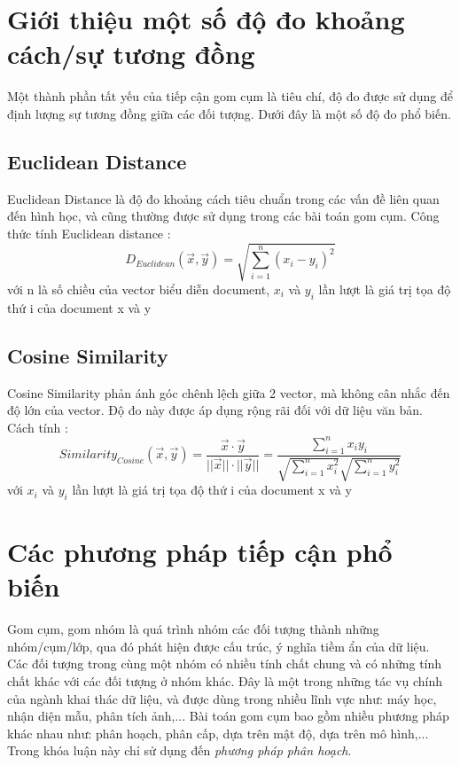 \section{Giới thiệu một số độ đo khoảng cách/sự tương đồng} \label{distances}
Một thành phần tất yếu của tiếp cận gom cụm là tiêu chí, độ đo được sử dụng để định lượng sự tương đồng giữa các đối tượng. Dưới đây là một số độ đo phổ biến.
	\subsection*{Euclidean Distance}
	Euclidean Distance là độ đo khoảng cách tiêu chuẩn trong các vấn đề liên quan đến hình học, và cũng thường được sử dụng trong các bài toán gom cụm. Công thức tính Euclidean distance \cite{IntroToIR}:
		\begin{equation}
		D_{Euclidean}(\vec{x}, \vec{y}) = \sqrt{\sum_{i=1}^n (x_i-y_i)^2}
		\end{equation}
	với n là số chiều của vector biểu diễn document, $x_i$ và $y_i$ lần lượt là giá trị tọa độ thứ i của document x và y\\	
	\subsection*{Cosine Similarity}
	Cosine Similarity phản ánh góc chênh lệch giữa 2 vector, mà không cân nhắc đến độ lớn của vector. Độ đo này được áp dụng rộng rãi đối với dữ liệu văn bản. Cách tính \cite{IntroToIR}: 
		\begin{equation}
		Similarity_{Cosine}(\vec{x}, \vec{y}) = \frac {\vec{x} \cdot \vec{y}}{||\vec{x}|| \cdot ||\vec{y}||} = \frac{\sum_{i=1}^{n}x_iy_i}{\sqrt{\sum_{i=1}^{n}x_i^2} \sqrt{\sum_{i=1}^{n}y_i^2}}	
		\end{equation}
	với  $x_i$ và $y_i$ lần lượt là giá trị tọa độ thứ i của document x và y
\section{Các phương pháp tiếp cận phổ biến}
Gom cụm, gom nhóm là quá trình nhóm các đối tượng thành những nhóm/cụm/lớp, qua đó phát hiện được cấu trúc, ý nghĩa tiềm ẩn của dữ liệu. Các đối tượng trong cùng một nhóm có nhiều tính chất chung và có những tính chất khác với các đối tượng ở nhóm khác. Đây là một trong những tác vụ chính của ngành khai thác dữ liệu, và được dùng trong nhiều lĩnh vực như: máy học, nhận diện mẫu, phân tích ảnh,...
Bài toán gom cụm bao gồm nhiều phương pháp khác nhau như: phân hoạch, phân cấp, dựa trên mật độ, dựa trên mô hình,... Trong khóa luận này chỉ sử dụng đến \textit{phương pháp phân hoạch}. 	
